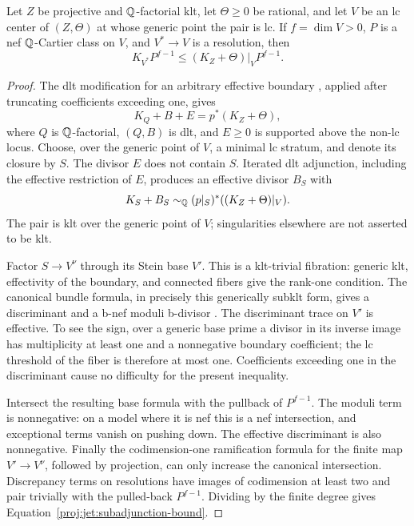 \begin{lemma}\label{proj:jet:subadjunction}
Let \(Z\) be projective and \(\mathbb{Q}\)-factorial klt, let
\(\Theta\ge0\) be rational, and let \(V\) be an lc center of
\((Z,\Theta)\) at whose generic point the pair is lc.
If \(f=\dim V>0\), \(P\) is a nef \(\mathbb{Q}\)-Cartier class on \(V\), and
\(V^*\to V\) is a resolution, then
\begin{equation}\label{proj:jet:subadjunction-bound}
 K_{V^*}P^{f-1}\le (K_Z+\Theta)|_V P^{f-1}.
\end{equation}
\end{lemma}

\begin{proof}
The dlt modification for an arbitrary effective boundary
\cite[Theorem~2.10]{Proj-FujinoHashizume2023}, applied after truncating
coefficients exceeding one, gives
\[
 K_Q+B+E=p^*(K_Z+\Theta),
\]
where \(Q\) is \(\mathbb{Q}\)-factorial, \((Q,B)\) is dlt, and \(E\ge0\)
is supported above the non-lc locus.  Choose, over the generic point
of \(V\), a minimal lc stratum, and denote its closure by \(S\).
The divisor \(E\) does not contain \(S\).  Iterated dlt adjunction,
including the effective restriction of \(E\), produces an effective
divisor \(B_S\) with
\[
 K_S+B_S\sim_{\mathbb{Q}}
 (p|_S)^*((K_Z+\Theta)|_V).
\]
The pair is klt over the generic point of \(V\); singularities elsewhere
are not asserted to be klt.

Factor \(S\to V^\nu\) through its Stein base \(V'\).  This is a
klt-trivial fibration: generic klt, effectivity of the boundary, and
connected fibers give the rank-one condition.  The canonical bundle
formula, in precisely this generically subklt form, gives a
discriminant and a b-nef moduli b-divisor
\cite[Definition~3.1 and Theorem~3.5]{Proj-FujinoGongyoModuli2014}.
The discriminant trace on \(V'\) is effective.  To see the sign,
over a generic base prime a divisor in its inverse image has
multiplicity at least one and a nonnegative boundary coefficient;
the lc threshold of the fiber is therefore at most one.
Coefficients exceeding one in the discriminant cause no difficulty
for the present inequality.

Intersect the resulting base formula with the pullback of \(P^{f-1}\).
The moduli term is nonnegative: on a model where it is nef this is a
nef intersection, and exceptional terms vanish on pushing down.
The effective discriminant is also nonnegative.  Finally the
codimension-one ramification formula for the finite map
\(V'\to V^\nu\), followed by projection, can only increase the
canonical intersection.  Discrepancy terms on resolutions have
images of codimension at least two and pair trivially with the
pulled-back \(P^{f-1}\).  Dividing by the finite degree gives
Equation~\eqref{proj:jet:subadjunction-bound}.
\end{proof}

